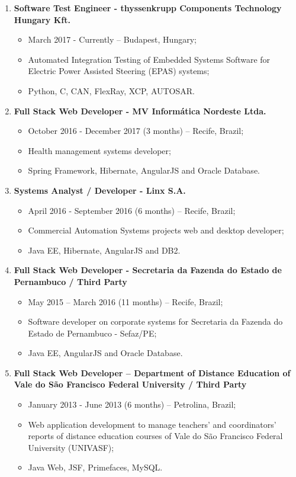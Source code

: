 \documentclass[10pt]{article}
\begin{document}
\begin{enumerate}

	\item \textbf{Software Test Engineer - thyssenkrupp Components Technology Hungary Kft.}
	\begin{itemize}
		\item March 2017 - Currently -- Budapest, Hungary;
		\item Automated Integration Testing of Embedded Systems Software for Electric Power Assisted Steering (EPAS) systems;
		\item Python, C, CAN, FlexRay, XCP, AUTOSAR.
	\end{itemize}

	\item \textbf{Full Stack Web Developer - MV Informática Nordeste Ltda.}
	\begin{itemize}
		\item October 2016 - December 2017 (3 months) -- Recife, Brazil;
		\item Health management systems developer;
	    \item Spring Framework, Hibernate, AngularJS and Oracle Database.
	\end{itemize}

	\item \textbf{Systems Analyst / Developer - Linx S.A.}
	\begin{itemize}
		\item April 2016 - September 2016 (6 months) -- Recife, Brazil;
		\item Commercial Automation Systems projects web and desktop developer;
		\item Java EE, Hibernate, AngularJS and DB2.
	\end{itemize}

	\item \textbf{Full Stack Web Developer - Secretaria da Fazenda do Estado de Pernambuco / Third Party}
	\begin{itemize}
		\item May 2015 -- March 2016 (11 months) -- Recife, Brazil;
		\item Software developer on corporate systems for Secretaria da Fazenda do Estado de Pernambuco - Sefaz/PE;
		\item Java EE, AngularJS and Oracle Database.
	\end{itemize}

	\item \textbf{Full Stack Web Developer -- Department of Distance Education of Vale do São Francisco Federal University / Third Party}
	\begin{itemize}
		\item January 2013 - June 2013 (6 months) -- Petrolina, Brazil;
		\item Web application development to manage teachers' and coordinators' reports of distance education courses of Vale do São Francisco Federal University (UNIVASF);
		\item Java Web, JSF, Primefaces, MySQL.
	\end{itemize}


\end{enumerate}
\end{document}
